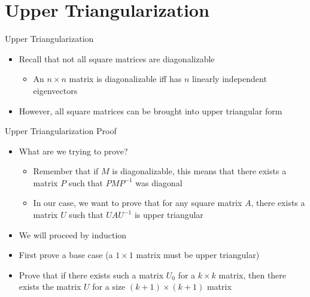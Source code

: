 \section{Upper Triangularization}


\begin{frame}{Upper Triangularization}

    \begin{itemize}
        \item
Recall that not all square matrices are diagonalizable
            \begin{itemize}
        \item
           An \(n \times n\) matrix is diagonalizable iff has \(n\) linearly independent eigenvectors
            \end{itemize}
        \item
However, all square matrices can be brought into upper triangular form
    \end{itemize}
\end{frame}

\begin{frame}{Upper Triangularization Proof}
    \begin{itemize}
        \item What are we trying to prove?
            \begin{itemize}
                \item
                    Remember that if \(M\) is diagonalizable, this means that there exists a matrix \(P\) such that \(PMP^{-1}\) was diagonal
                \item In our case, we want to prove that for any square matrix \(A\), there exists a matrix \(U\) such that \(UAU^{-1}\) is upper triangular
            \end{itemize}
        \item We will proceed by induction
        \item First prove a base case (a \(1 \times 1\) matrix must be upper triangular)
        \item  Prove that if there exists such a matrix \(U_0\) for a \(k \times k\) matrix, then there exists the matrix \(U\) for a size \((k+1) \times (k+1)\) matrix
    \end{itemize}
\end{frame}

